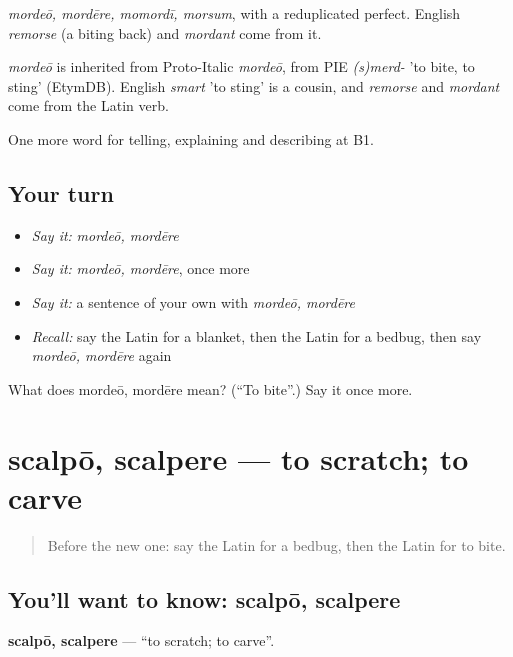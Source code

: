 \emph{mordeō, mordēre, momordī, morsum}, with a reduplicated perfect. English \emph{remorse} (a biting back) and \emph{mordant} come from it.

\begin{cousinweb}
\emph{mordeō} is inherited from Proto-Italic \emph{mordeō}, from PIE \emph{(s)merd-} 'to bite, to sting' (EtymDB). English \emph{smart} 'to sting' is a cousin, and \emph{remorse} and \emph{mordant} come from the Latin verb.
\end{cousinweb}

\begin{grammarlens}[title={What you've built}]
One more word for telling, explaining and describing at B1.
\end{grammarlens}

\subsection*{Your turn}
\begin{itemize}
\raggedright
  \item \emph{Say it:} \emph{mordeō, mordēre}
  \item \emph{Say it:} \emph{mordeō, mordēre}, once more
  \item \emph{Say it:} a sentence of your own with \emph{mordeō, mordēre}
  \item \emph{Recall:} say the Latin for a blanket, then the Latin for a bedbug, then say \emph{mordeō, mordēre} again
\end{itemize}

\begin{tcolorbox}[breakable,colback=teal!4,colframe=teal!35!black,title={Before you move on}]
What does mordeō, mordēre mean? (\textquotedblleft{}To bite\textquotedblright{}.) Say it once more.
\end{tcolorbox}
\section[scalpō, scalpere]{scalpō, scalpere — to scratch; to carve}

\label{lesson:LA-C447-scalpo}



\begin{quote}
Before the new one: say the Latin for a bedbug, then the Latin for to bite.
\end{quote}

\subsection*{You'll want to know: scalpō, scalpere}
\textbf{scalpō, scalpere} — \textquotedblleft{}to scratch; to carve\textquotedblright{}.

